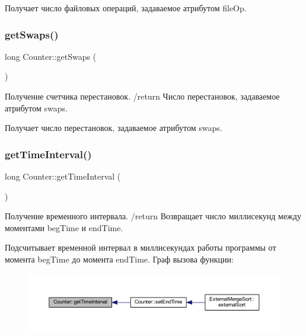Получает число файловых операций, задаваемое атрибутом file\+Op. \hypertarget{class_counter_af20f10e30e8bd1d078d1d66c518a814c}{}\label{class_counter_af20f10e30e8bd1d078d1d66c518a814c} 
\subsubsection{\texorpdfstring{get\+Swaps()}{getSwaps()}}
{\footnotesize\ttfamily long Counter\+::get\+Swaps (\begin{DoxyParamCaption}{ }\end{DoxyParamCaption})}



Получение счетчика перестановок. /return Число перестановок, задаваемое атрибутом swaps. 

Получает число перестановок, задаваемое атрибутом swaps. \hypertarget{class_counter_a25b1a1a6cd43fb23c2d1563d5b05aec6}{}\label{class_counter_a25b1a1a6cd43fb23c2d1563d5b05aec6} 
\subsubsection{\texorpdfstring{get\+Time\+Interval()}{getTimeInterval()}}
{\footnotesize\ttfamily long Counter\+::get\+Time\+Interval (\begin{DoxyParamCaption}{ }\end{DoxyParamCaption})}



Получение временного интервала. /return Возвращает число миллисекунд между моментами beg\+Time и end\+Time. 

Подсчитывает временной интервал в миллисекундах работы программы от момента beg\+Time до момента end\+Time. Граф вызова функции\+:\nopagebreak
\begin{figure}[H]
\begin{center}
\leavevmode
\includegraphics[width=350pt]{class_counter_a25b1a1a6cd43fb23c2d1563d5b05aec6_icgraph}
\end{center}
\end{figure}
\hypertarget{class_counter_a224d93150c0fe2982d3efd7aa99668e6}{}\label{class_counter_a224d93150c0fe2982d3efd7aa99668e6} 
